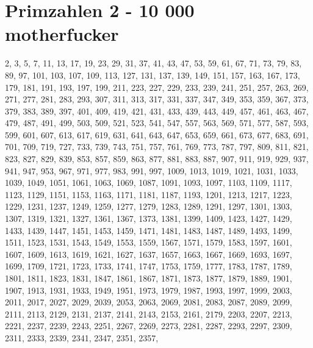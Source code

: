 \documentclass[landscape,twocolumn,a4paper]{article}
\begin{document}
\section{Primzahlen 2 - 10 000 motherfucker }
    2,     3,     5,     7,    11,    13,    17,    19,    23,    29,    31,    37,    41,    43,
   47,    53,    59,    61,    67,    71,    73,    79,    83,    89,    97,   101,   103,   107,
  109,   113,   127,   131,   137,   139,   149,   151,   157,   163,   167,   173,   179,   181,
  191,   193,   197,   199,   211,   223,   227,   229,   233,   239,   241,   251,   257,   263,
  269,   271,   277,   281,   283,   293,   307,   311,   313,   317,   331,   337,   347,   349,
  353,   359,   367,   373,   379,   383,   389,   397,   401,   409,   419,   421,   431,   433,
  439,   443,   449,   457,   461,   463,   467,   479,   487,   491,   499,   503,   509,   521,
  523,   541,   547,   557,   563,   569,   571,   577,   587,   593,   599,   601,   607,   613,
  617,   619,   631,   641,   643,   647,   653,   659,   661,   673,   677,   683,   691,   701,
  709,   719,   727,   733,   739,   743,   751,   757,   761,   769,   773,   787,   797,   809,
  811,   821,   823,   827,   829,   839,   853,   857,   859,   863,   877,   881,   883,   887,
  907,   911,   919,   929,   937,   941,   947,   953,   967,   971,   977,   983,   991,   997,
 1009,  1013,  1019,  1021,  1031,  1033,  1039,  1049,  1051,  1061,  1063,  1069,  1087,  1091,
 1093,  1097,  1103,  1109,  1117,  1123,  1129,  1151,  1153,  1163,  1171,  1181,  1187,  1193,
 1201,  1213,  1217,  1223,  1229,  1231,  1237,  1249,  1259,  1277,  1279,  1283,  1289,  1291,
 1297,  1301,  1303,  1307,  1319,  1321,  1327,  1361,  1367,  1373,  1381,  1399,  1409,  1423,
 1427,  1429,  1433,  1439,  1447,  1451,  1453,  1459,  1471,  1481,  1483,  1487,  1489,  1493,
 1499,  1511,  1523,  1531,  1543,  1549,  1553,  1559,  1567,  1571,  1579,  1583,  1597,  1601,
 1607,  1609,  1613,  1619,  1621,  1627,  1637,  1657,  1663,  1667,  1669,  1693,  1697,  1699,
 1709,  1721,  1723,  1733,  1741,  1747,  1753,  1759,  1777,  1783,  1787,  1789,  1801,  1811,
 1823,  1831,  1847,  1861,  1867,  1871,  1873,  1877,  1879,  1889,  1901,  1907,  1913,  1931,
 1933,  1949,  1951,  1973,  1979,  1987,  1993,  1997,  1999,  2003,  2011,  2017,  2027,  2029,
 2039,  2053,  2063,  2069,  2081,  2083,  2087,  2089,  2099,  2111,  2113,  2129,  2131,  2137,
 2141,  2143,  2153,  2161,  2179,  2203,  2207,  2213,  2221,  2237,  2239,  2243,  2251,  2267,
 2269,  2273,  2281,  2287,  2293,  2297,  2309,  2311,  2333,  2339,  2341,  2347,  2351,  2357,
\end{document}
